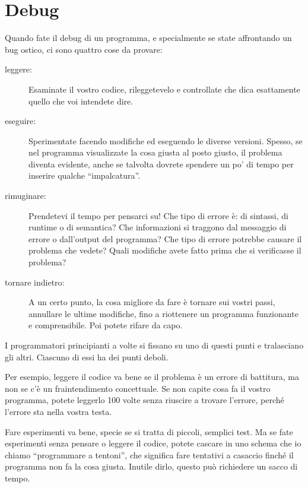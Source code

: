 \documentclass[10pt]{book}
\begin{document}
\section{Debug}

Quando fate il debug di un programma, e specialmente se state affrontando un bug ostico, ci sono quattro cose da provare:

\begin{description}

\item[leggere:] Esaminate il vostro codice, rileggetevelo e controllate che dica esattamente quello che voi intendete dire.

\item[eseguire:] Sperimentate facendo modifiche ed eseguendo le diverse versioni. Spesso, se nel programma visualizzate la cosa giusta al posto giusto, il problema diventa evidente, anche se talvolta dovrete spendere un po' di tempo per inserire qualche ``impalcatura''.

\item[rimuginare:] Prendetevi il tempo per pensarci su! Che tipo di errore è: di sintassi, di runtime o di semantica? Che informazioni si traggono dal messaggio di errore o dall'output del programma? Che tipo di errore potrebbe causare il problema che vedete? Quali modifiche avete fatto prima che si verificasse il problema?

\item[tornare indietro:] A un certo punto, la cosa migliore da fare è tornare sui vostri passi, annullare le ultime modifiche, fino a riottenere un programma funzionante e comprensibile. Poi potete rifare da capo.

\end{description}

I programmatori principianti a volte si fissano su uno di questi punti e tralasciano gli altri. Ciascuno di essi ha dei punti deboli.

Per esempio, leggere il codice va bene se il problema è un errore di battitura, ma non se c'è un fraintendimento concettuale. Se non capite cosa fa il vostro programma, potete leggerlo 100 volte senza riuscire a trovare l'errore, perché l'errore sta nella vostra testa.

Fare esperimenti va bene, specie se si tratta di piccoli, semplici test. Ma se fate esperimenti senza pensare o leggere il codice, potete cascare in uno schema che io chiamo ``programmare a tentoni'', che significa fare tentativi a casaccio finché il programma non fa la cosa giusta. Inutile dirlo, questo può richiedere un sacco di tempo.
\end{document}
